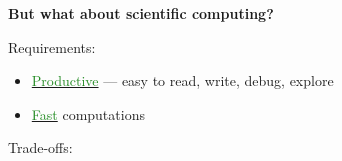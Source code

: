 \documentclass[
    xcolor={svgnames,dvipsnames},
    hyperref={colorlinks, citecolor=DeepPink4, linkcolor=DarkRed, urlcolor=DarkBlue}
    ]{beamer}  %
\newcommand{\green}[1]{\textcolor{ForestGreen}{\sf #1}}
\newcommand{\emp}[1]{\textcolor{DarkOrange1}{\bf #1}}
\newcommand{\1}{\mathbbm 1}
\begin{document}
\begin{frame}[fragile]

    \emp{But what about scientific computing?}
    
            \vspace{0.4em}
            \vspace{0.4em}
            \vspace{0.4em}

    Requirements:

    \begin{itemize}
        \item \underline{\green{Productive}} --- easy to read, write, debug, explore
            \vspace{0.4em}
            \vspace{0.4em}
            \vspace{0.4em}
        \item \underline{\green{Fast}} computations
    \end{itemize}

\end{frame}




\begin{frame}

    Trade-offs:

    \begin{figure}
       \begin{center}
       \end{center}
    \end{figure}

\end{frame}
\end{document}
